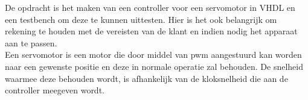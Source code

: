 De opdracht is het maken van een controller voor een servomotor in VHDL en een testbench om deze te kunnen uittesten. Hier is het ook belangrijk om rekening te houden met de vereisten van de klant en indien nodig het apparaat aan te passen.\\
Een servomotor is een motor die door middel van \gls{pwm} aangestuurd kan worden naar een gewenste positie en deze in normale operatie zal behouden. De snelheid waarmee deze behouden wordt, is afhankelijk van de kloksnelheid die aan de controller meegeven wordt.